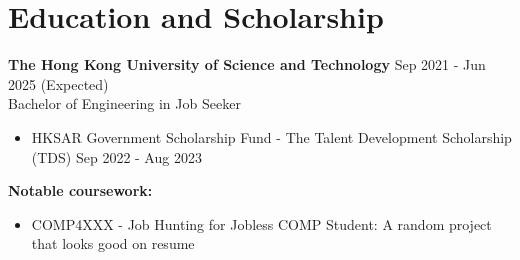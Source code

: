 \section{Education and Scholarship}
\textbf{The Hong Kong University of Science and Technology} \hfill Sep 2021 - Jun 2025 (Expected)\\
Bachelor of Engineering in Job Seeker \hfill {} 
\begin{itemize}
\item  HKSAR Government Scholarship Fund - The Talent Development Scholarship (TDS) \hfill Sep 2022 - Aug 2023\
\end{itemize}
\textbf{{Notable coursework:}}
\begin{itemize}
    \item COMP4XXX - Job Hunting for Jobless COMP Student: A random project that looks good on resume
    \ifthenelse{\not\boolean{showCGA}}{
        }{}
\end{itemize}